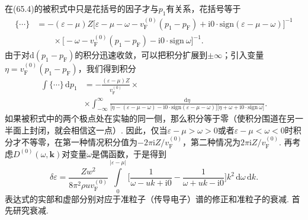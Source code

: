 在(65.4)的被积式中只是花括号的因子才与$p_1$有关系，花括号等于
\begin{equation*}
\begin{aligned}
\{\cdots\}&=-(\varepsilon-\mu)Z\bigl[\varepsilon-\mu-\omega
-v^{(0)}_{\mathrm F}(p_1-p_{\mathrm F})
+\mathrm{i}0\cdot\mathrm{sign}(\varepsilon-\mu-\omega)\bigr]^{-1}\\
&\qquad\times\bigl[-\omega-v^{(0)}_{\mathrm F}(p_1-p_{\mathrm F})
-\mathrm{i}0\cdot\mathrm{sign}\ \omega\bigr]^{-1}.
\end{aligned}
\end{equation*}
由于对$\mathrm{d}(p_1-p_{\mathrm F})$的积分迅速收敛，可以把积分扩展到$\pm\infty$；引入变量$\eta=v^{(0)}_{\mathrm F}(p_1-p_{\mathrm F})$，我们得到积分
\begin{equation*}
\begin{aligned}
\int\{\cdots\}\,\mathrm{d}p_1&=-\frac{(\varepsilon-\mu)Z}{v^{(0)}_{\mathrm F}}\times{}\\
&\times\int_{-\infty}^{\infty}
\frac{\mathrm{d}\eta}{\bigl[\eta-(\varepsilon-\mu-\omega)
-\mathrm{i}0\cdot\mathrm{sign}(\varepsilon-\mu-\omega)\bigr]
\bigl[\eta+\omega+\mathrm{i}0\cdot\mathrm{sign}\ \omega\bigr]}.
\end{aligned}
\end{equation*}
如果被积式中的两个极点处在实轴的同一侧，那么积分等于零（使积分围道在另一半面上封闭，就会相信这一点）. 因此，仅当$\varepsilon-\mu>\omega>0$或者$\varepsilon-\mu<\omega<0$时积分才不等零，在第一种情况积分值为$-2\pi\mathrm{i}Z/v^{(0)}_{\mathrm F}$，第二种情况为$2\pi\mathrm{i}Z/v^{(0)}_{\mathrm F}$. 再考虑$D^{(0)}(\omega,\bm{k})$对变量$\omega$是偶函数，于是得到
\begin{equation}
\delta\varepsilon=\frac{Zw^2}{8\pi^2\rho uv^{(0)}_{\mathrm F}}
\int\limits_0^{|\varepsilon-\mu|}
\biggl[\frac{1}{\omega-uk+\mathrm{i}0}
-\frac{1}{\omega+uk-\mathrm{i}0}\biggr]k^2\,\mathrm{d}\omega\,\mathrm{d}k.
\end{equation}
表达式的实部和虚部分别对应于准粒子（传导电子）谱的修正和准粒子的衰减. 首先研究衰减.

